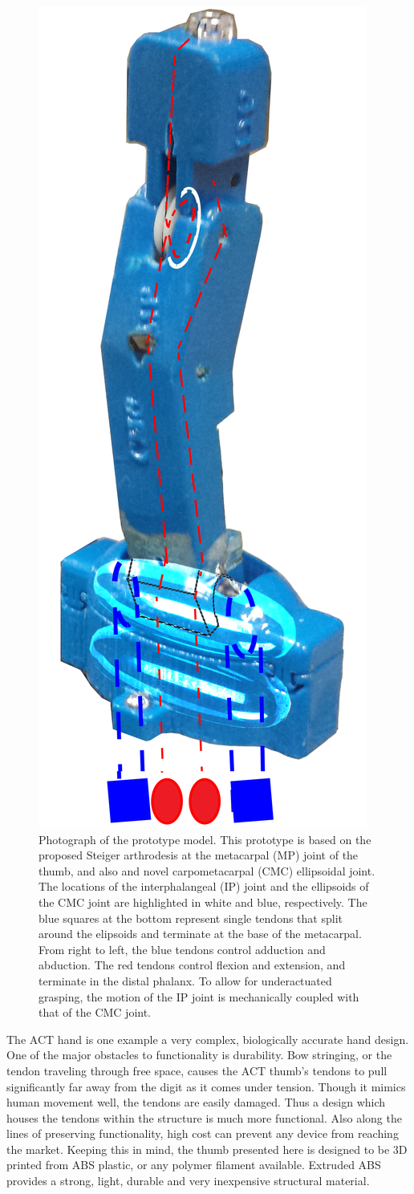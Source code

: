 \documentclass[letterpaper, 10 pt, conference]{ieeeconf}  %
\begin{document}
\begin{figure}
	\centering
	\includegraphics[width = 0.5\columnwidth]{thumb}
	\caption{Photograph of the prototype model. This prototype is based on the proposed Steiger arthrodesis at the metacarpal (MP) joint of the thumb, and also  and novel carpometacarpal (CMC) ellipsoidal joint. The locations of the interphalangeal (IP) joint and the ellipsoids of the CMC joint are highlighted in white and blue, respectively. The blue squares at the bottom represent single tendons that split around the elipsoids and terminate at the base of the metacarpal. From right to left, the blue tendons control adduction and abduction. The red tendons control flexion and extension, and terminate in the distal phalanx. To allow for underactuated grasping, the motion of the IP joint is mechanically coupled with that of the CMC joint. }\label{thumbphoto}
	\vspace{-15pt}
\end{figure}

The ACT hand is one example a very complex, biologically accurate hand design. One of the major obstacles to functionality is durability. Bow stringing, or the tendon traveling through free space, causes the ACT thumb's tendons to pull significantly far away from the digit as it comes under tension. Though it mimics human movement well, the tendons are easily damaged. Thus a design which houses the tendons within the structure is much more functional. Also along the lines of preserving functionality, high cost can prevent any device from reaching  the market. Keeping this in mind, the thumb presented here is designed to be 3D printed from ABS plastic, or any polymer filament available. Extruded ABS provides a strong, light, durable and very inexpensive structural material.
\end{document}
